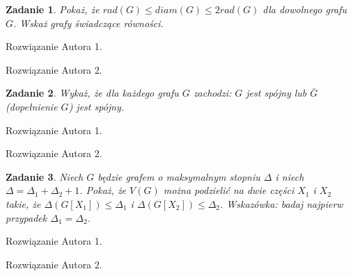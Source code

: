 \documentclass{mwart}
\newtheorem{zad}{Zadanie}[section]
\begin{document}
\begin{zad}
    Pokaż, że $rad(G) \leq diam(G) \leq 2 rad(G)$ dla dowolnego grafu $G$. Wskaż grafy świadczące równości.
\end{zad}
\begin{mdframed}
    Rozwiązanie Autora 1.
\end{mdframed}
\begin{mdframed}
    Rozwiązanie Autora 2.
\end{mdframed}



\begin{zad}
    Wykaż, że dla każdego grafu $G$ zachodzi: $G$ jest spójny lub $\bar{G}$ (dopełnienie $G$) jest spójny.
\end{zad}
\begin{mdframed}
    Rozwiązanie Autora 1.
\end{mdframed}
\begin{mdframed}
    Rozwiązanie Autora 2.
\end{mdframed}


\begin{zad}
    Niech $G$ będzie grafem o maksymalnym stopniu $\Delta$ i niech $\Delta = \Delta_1 + \Delta_2 +1$.
    Pokaż, że $V(G)$ można podzielić na dwie części $X_1$ i $X_2$ takie, że $\Delta (G[X_1]) \leq \Delta_1$ i $\Delta (G[X_2]) \leq \Delta_2$.
    Wskazówka: badaj najpierw przypadek $\Delta_1 = \Delta_2$.
\end{zad}
\begin{mdframed}
    Rozwiązanie Autora 1.
\end{mdframed}
\begin{mdframed}
    Rozwiązanie Autora 2.
\end{mdframed}












\end{document}
